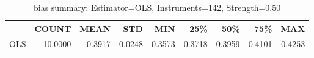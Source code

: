 \begin{table}[ht]
\centering
\caption{bias summary: Estimator=OLS, Instruments=142, Strength=0.50}
\begin{tabular}{lrrrrrrrr}
\toprule
 & COUNT & MEAN & STD & MIN & 25\% & 50\% & 75\% & MAX \\
\midrule
OLS & 10.0000 & 0.3917 & 0.0248 & 0.3573 & 0.3718 & 0.3959 & 0.4101 & 0.4253 \\
\bottomrule
\end{tabular}
\end{table}
